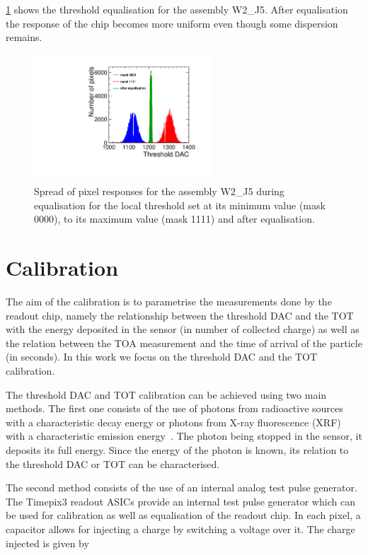\cref{fig:THLequalisation} shows the threshold equalisation for the
assembly W2\_J5. After equalisation the response of the chip becomes
more uniform even though some dispersion remains.

\begin{figure}[htbp] 
  \centering
  \includegraphics[width=0.6\textwidth]{./figures/Calibration/THLequalisation_W2_J5.pdf}
  \caption{Spread of pixel responses for the assembly W2\_J5 during
    equalisation for the local threshold set at its minimum value
    (mask 0000), to its maximum value (mask 1111) and after
    equalisation.}
  \label{fig:THLequalisation}
\end{figure}

\section{Calibration} \label{sec:calibration} The aim of the
calibration is to parametrise the measurements done by the readout
chip, namely the relationship between the threshold DAC and the TOT
with the energy deposited in the sensor (in number of collected
charge) as well as the relation between the TOA measurement and the
time of arrival of the particle (in seconds). In this work we focus on
the threshold DAC and the TOT calibration.

The threshold DAC and TOT calibration can be achieved using two main
methods. The first one consists of the use of photons from radioactive
sources with a characteristic decay energy or photons from X-ray
fluorescence (XRF) with a characteristic emission
energy~\cite{AlipourTehrani:2054922}. The photon being stopped in the
sensor, it deposits its full energy. Since the energy of the photon is
known, its relation to the threshold DAC or TOT can be characterised. 

The second method consists of the use of an internal analog test pulse
generator. The Timepix3 readout ASICs provide an internal test pulse
generator which can be used for calibration as well as equalisation of
the readout chip. In each pixel, a capacitor allows for injecting a
charge by switching a voltage over it. The charge injected is given by

